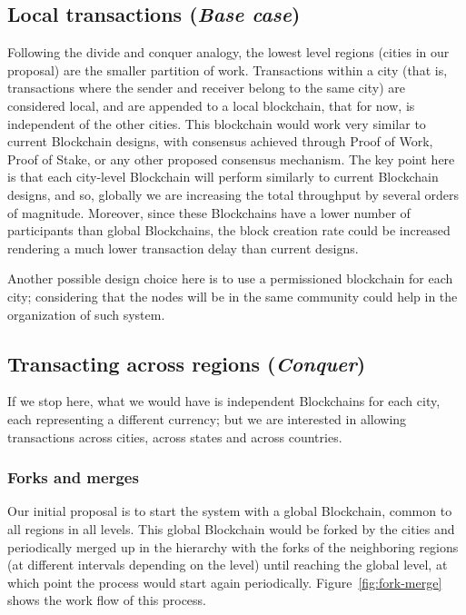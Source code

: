 \subsection{Local transactions (\textit{Base case})}

Following the divide and conquer analogy, the lowest level regions (cities in
our proposal) are the smaller partition of work.  Transactions within a city
(that is, transactions where the sender and receiver belong to the same city)
are considered local, and are appended to a local blockchain, that for now, is
independent of the other cities.  This blockchain would work very similar to
current Blockchain designs, with consensus achieved through Proof of Work,
Proof of Stake, or any other proposed consensus mechanism.  The key point here
is that each city-level Blockchain will perform similarly to current Blockchain
designs, and so, globally we are increasing the total throughput by several
orders of magnitude.  Moreover, since these Blockchains have a lower number of
participants than global Blockchains, the block creation rate could be
increased rendering a much lower transaction delay than current designs.

Another possible design choice here is to use a permissioned blockchain for
each city; considering that the nodes will be in the same community could help
in the organization of such system.

\subsection{Transacting across regions (\textit{Conquer})}

If we stop here, what we would have is independent Blockchains for each city,
each representing a different currency; but we are interested in allowing
transactions across cities, across states and across countries.

\subsubsection{Forks and merges}

Our initial proposal is to start the system with a global Blockchain, common to
all regions in all levels.  This global Blockchain would be forked by the
cities and periodically merged up in the hierarchy with the forks of the
neighboring regions (at different intervals depending on the level) until
reaching the global level, at which point the process would start again
periodically.  Figure~\ref{fig:fork-merge} shows the work flow of this process.

